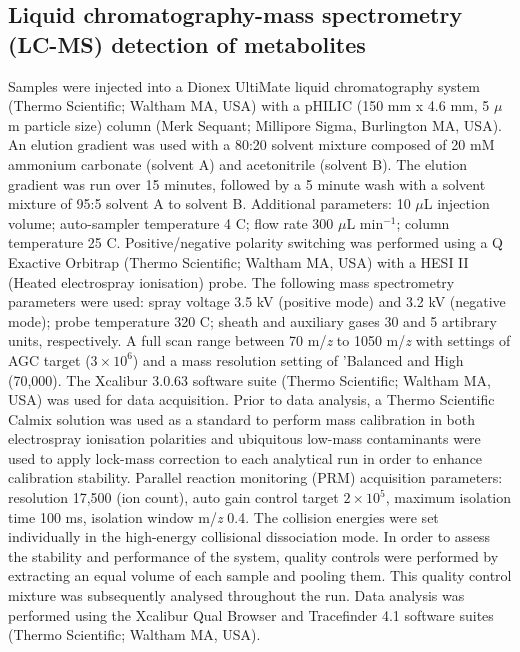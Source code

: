 \subsection{Liquid chromatography-mass spectrometry (LC-MS) detection of metabolites}
Samples were injected into a Dionex UltiMate liquid chromatography system (Thermo Scientific; Waltham MA, USA) with a pHILIC (150 mm x 4.6 mm, 5 $\mu$m particle size) column (Merk Sequant; Millipore Sigma, Burlington MA, USA). An elution gradient was used with a 80:20 solvent mixture composed of 20 mM ammonium carbonate (solvent A) and acetonitrile (solvent B). The elution gradient was run over 15 minutes, followed by a 5 minute wash with a solvent mixture of 95:5 solvent A to solvent B. Additional parameters: 10 $\mu$L injection volume; auto-sampler temperature 4 \textdegree C; flow rate 300 $\mu$L min$^{-1}$; column temperature 25 \textdegree C. Positive/negative polarity switching was performed using a Q Exactive Orbitrap (Thermo Scientific; Waltham MA, USA) with a HESI II (Heated electrospray ionisation) probe. The following mass spectrometry parameters were used: spray voltage 3.5 kV (positive mode) and 3.2 kV (negative mode); probe temperature 320 \textdegree C; sheath and auxiliary gases 30 and 5 artibrary units, respectively. A full scan range between 70 m/\textit{z} to 1050 m/\textit{z} with settings of AGC target ($3 \times 10^{6}$) and a mass resolution setting of 'Balanced and High (70,000). The Xcalibur 3.0.63 software suite (Thermo Scientific; Waltham MA, USA) was used for data acquisition. Prior to data analysis, a Thermo Scientific Calmix solution was used as a standard to perform mass calibration in both electrospray ionisation polarities and ubiquitous low-mass contaminants were used to apply lock-mass correction to each analytical run in order to enhance calibration stability. Parallel reaction monitoring (PRM) acquisition parameters: resolution 17,500 (ion count), auto gain control target $2 \times 10^{5}$, maximum isolation time 100 ms, isolation window m/\textit{z} 0.4. The collision energies were set individually in the high-energy collisional dissociation mode. In order to assess the stability and performance of the system, quality controls were performed by extracting an equal volume of each sample and pooling them. This quality control mixture was subsequently analysed throughout the run. Data analysis was performed using the Xcalibur Qual Browser and Tracefinder 4.1 software suites (Thermo Scientific; Waltham MA, USA).

